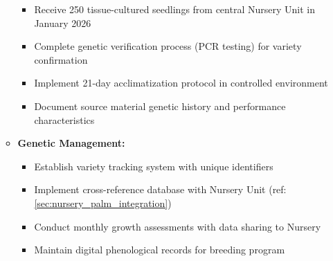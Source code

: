 \begin{itemize}
\begin{itemize}
        \begin{itemize}
            \item Receive 250 tissue-cultured seedlings from central Nursery Unit in January 2026
            \item Complete genetic verification process (PCR testing) for variety confirmation
            \item Implement 21-day acclimatization protocol in controlled environment
            \item Document source material genetic history and performance characteristics
        \end{itemize}
        \item \textbf{Genetic Management:}
        \begin{itemize}
            \item Establish variety tracking system with unique identifiers
            \item Implement cross-reference database with Nursery Unit (ref: \ref{sec:nursery_palm_integration})
            \item Conduct monthly growth assessments with data sharing to Nursery
            \item Maintain digital phenological records for breeding program
        \end{itemize}
    \end{itemize}
\end{itemize}

